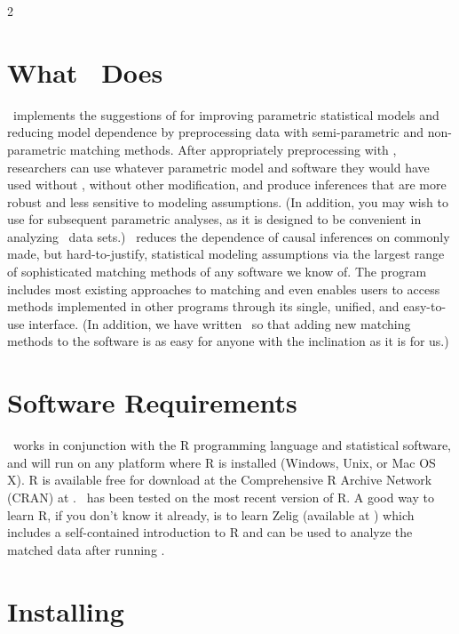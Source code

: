 2
\section{What \MatchIt\ Does}

\MatchIt\ implements the suggestions of \citet*{HoImaKin07} for
improving parametric statistical models and reducing model dependence
by preprocessing data with semi-parametric and non-parametric matching
methods.  After appropriately preprocessing with \MatchIt, researchers
can use whatever parametric model and software they would have used
without \MatchIt, without other modification, and produce inferences
that are more robust and less sensitive to modeling assumptions.  (In
addition, you may wish to use
 \citep{ImaKinLau06} for
subsequent parametric analyses, as it is designed to be convenient in
analyzing \MatchIt\ data sets.)  \MatchIt\ reduces the dependence of
causal inferences on commonly made, but hard-to-justify, statistical
modeling assumptions via the largest range of sophisticated matching
methods of any software we know of.  The program includes most
existing approaches to matching and even enables users to access
methods implemented in other programs through its single, unified, and
easy-to-use interface.  (In addition, we have written \MatchIt\ so
that adding new matching methods to the software is as easy for anyone
with the inclination as it is for us.)

\section{Software Requirements} 
\label{sec:require}

\MatchIt\ works in conjunction with the R programming language and
statistical software, and will run on any platform where R is
installed (Windows, Unix, or Mac OS X).  R is available free for
download at the Comprehensive R Archive Network (CRAN) at
.
\MatchIt\ has been tested on the most recent version of R.  A good way
to learn R, if you don't know it already, is to learn Zelig (available
at
)
which includes a self-contained introduction to R and can be used to
analyze the matched data after running \MatchIt.

\section{Installing \MatchIt}
\label{sec:install}

